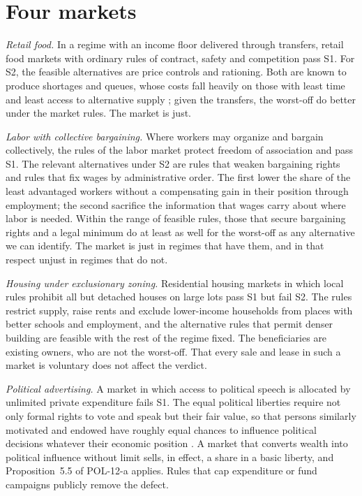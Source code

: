 \documentclass{situationist-preprint}
\begin{document}
\section{Four markets}

\emph{Retail food.} In a regime with an income floor delivered through transfers, retail food markets with ordinary rules of contract, safety and competition pass S1. For S2, the feasible alternatives are price controls and rationing. Both are known to produce shortages and queues, whose costs fall heavily on those with least time and least access to alternative supply \citep{Sen1981}; given the transfers, the worst-off do better under the market rules. The market is just.

\emph{Labor with collective bargaining.} Where workers may organize and bargain collectively, the rules of the labor market protect freedom of association and pass S1. The relevant alternatives under S2 are rules that weaken bargaining rights and rules that fix wages by administrative order. The first lower the share of the least advantaged workers without a compensating gain in their position through employment; the second sacrifice the information that wages carry about where labor is needed. Within the range of feasible rules, those that secure bargaining rights and a legal minimum do at least as well for the worst-off as any alternative we can identify. The market is just in regimes that have them, and in that respect unjust in regimes that do not.

\emph{Housing under exclusionary zoning.} Residential housing markets in which local rules prohibit all but detached houses on large lots pass S1 but fail S2. The rules restrict supply, raise rents and exclude lower-income households from places with better schools and employment, and the alternative rules that permit denser building are feasible with the rest of the regime fixed. The beneficiaries are existing owners, who are not the worst-off. That every sale and lease in such a market is voluntary does not affect the verdict.

\emph{Political advertising.} A market in which access to political speech is allocated by unlimited private expenditure fails S1. The equal political liberties require not only formal rights to vote and speak but their fair value, so that persons similarly motivated and endowed have roughly equal chances to influence political decisions whatever their economic position \citep[\S36]{Rawls1971}. A market that converts wealth into political influence without limit sells, in effect, a share in a basic liberty, and Proposition~5.5 of POL-12-a applies. Rules that cap expenditure or fund campaigns publicly remove the defect.
\end{document}
